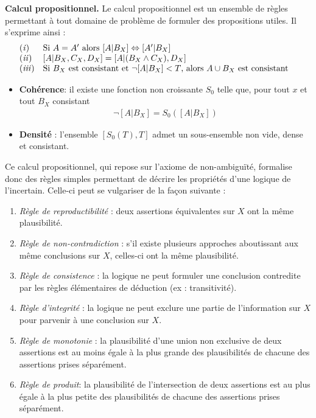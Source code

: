 \begin{definition}{\bf Calcul propositionnel.}
Le calcul propositionnel est un ensemble de règles  permettant à tout domaine de problème de formuler des propositions utiles. Il s'exprime ainsi :
\begin{eqnarray*}
\left.
\begin{array}{ll}
{\it (i)} & \text{Si $A=A'$ alors $[A|B_X] \Leftrightarrow [A'|B_X]$} \\
{\it (ii)} & \text{$[A|B_X,C_X,D_X]=[A|(B_X \land C_X),D_X]$} \\
{\it (iii)} & \text{Si $B_X$ est consistant et $\neg[A|B_X]<T$, alors $A\cup B_X$ est consistant} \\
\end{array}
\right. & %
\end{eqnarray*}
\begin{itemize}
\item  {\bf Cohérence}: il existe une fonction non croissante  $S_0$ telle que, pour tout $x$ et tout $B_X$ consistant
\begin{eqnarray*}
\neg[A|B_X]=S_0([A|B_X])
\end{eqnarray*}
\item {\bf Densité} : l'ensemble $[S_0(T),T]$ admet un sous-ensemble non vide, dense et consistant.
\end{itemize}

\end{definition}

Ce calcul propositionnel, qui repose sur l'axiome de non-ambigu\"ité,  formalise donc des règles simples permettant de décrire les propriétés d'une logique de l'incertain. Celle-ci peut se vulgariser de la fa\c con suivante : 
\begin{enumerate}
\item \emph{Règle de reproductibilité} : deux assertions équivalentes sur $X$ ont la même plausibilité.
\item \emph{Règle de non-contradiction} : s'il existe plusieurs approches aboutissant aux même conclusions sur $X$, celles-ci ont la même plausibilité. 
\item \emph{Règle de consistence} : la logique ne peut formuler une conclusion contredite par les règles élémentaires de déduction (ex : transitivité). 
\item \emph{Règle d'integrité} : la logique ne peut exclure une partie de l'information sur $X$ pour parvenir à une conclusion sur $X$. 
\item \emph{Règle de monotonie} : la plausibilité d'une union non exclusive de deux assertions est au moins égale à la plus grande des plausibilités de chacune des assertions prises séparément. 
\item \emph{Règle de produit}: la plausibilité de l'intersection  de deux assertions est au plus égale à la plus petite des plausibilités de chacune des assertions prises séparément.  \\
\end{enumerate}

